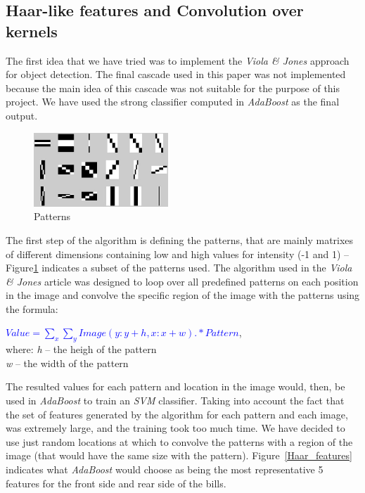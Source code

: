 \documentclass[11pt,twocolumn]{article}
\begin{document}
	\subsection{Haar-like features and Convolution over kernels}\label{sec:Haar}
	\hspace*{10px}The first idea that we have tried was to implement the \emph{Viola \& Jones} approach for object detection. The final cascade used in this paper was not implemented because the main idea of this cascade was not suitable for the purpose of this project. We have used the strong classifier computed in \emph{AdaBoost} as the final output.\\
\begin{figure}[!hbtp]
\centering
\includegraphics[width=0.45\textwidth]{img/patterns.jpg}
\caption{Patterns}
\label{patterns}
\end{figure}
	\hspace*{10px}The first step of the algorithm is defining the patterns, that are mainly matrixes of different dimensions containing low and high values for intensity (-1 and 1) -- Figure\ref{patterns} indicates a subset of the patterns used. The algorithm used in the \emph{Viola \& Jones} article was designed to loop over all predefined patterns on each position in the image and convolve the specific region of the image with the patterns using the formula:
\begin{flushleft}
\selectfont\small
\textcolor{blue}{\emph{$Value = \sum_x\sum_y Image(y:y+h,x:x+w) .* Pattern$}},\\[5pt]
where: \emph{h} -- the heigh of the pattern\\
\hspace*{28px} \emph{w} -- the width of the pattern 
\end{flushleft}
The resulted values for each pattern and location in the image would, then, be used in \emph{AdaBoost} to train an \emph{SVM} classifier. Taking into account the fact that the set of features generated by the algorithm for each pattern and each image, was extremely large, and the training took too much time. We have decided to use just random locations at which to convolve the patterns with a region of the image (that would have the same size with the pattern). Figure~\ref{Haar_features} indicates what \emph{AdaBoost} would choose as being the most representative 5 features for the front side and rear side of the bills.\\
\end{document}
